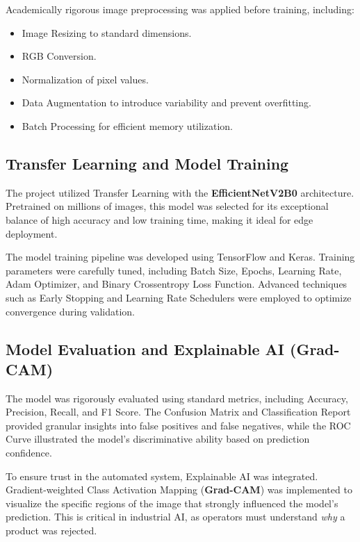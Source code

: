 Academically rigorous image preprocessing was applied before training, including:
\begin{itemize}[leftmargin=1.5cm]
    \item Image Resizing to standard dimensions.
    \item RGB Conversion.
    \item Normalization of pixel values.
    \item Data Augmentation to introduce variability and prevent overfitting.
    \item Batch Processing for efficient memory utilization.
\end{itemize}

\subsection{Transfer Learning and Model Training}

The project utilized Transfer Learning with the \textbf{EfficientNetV2B0} architecture. Pretrained on millions of images, this model was selected for its exceptional balance of high accuracy and low training time, making it ideal for edge deployment.

The model training pipeline was developed using TensorFlow and \cite{keras} Keras. Training parameters were carefully tuned, including Batch Size, Epochs, Learning Rate, Adam Optimizer, and Binary Crossentropy Loss Function. Advanced techniques such as Early Stopping and Learning Rate Schedulers were employed to optimize convergence during validation.

\subsection{Model Evaluation and Explainable AI (Grad-CAM)}

The model was rigorously evaluated using standard metrics, including Accuracy, Precision, Recall, and F1 Score. The Confusion Matrix and Classification Report provided granular insights into false positives and false negatives, while the ROC Curve illustrated the model's discriminative ability based on prediction confidence.

To ensure trust in the automated system, Explainable AI was integrated. Gradient-weighted Class Activation Mapping (\textbf{Grad-CAM}) was implemented to visualize the specific regions of the image that strongly influenced the model's prediction. This is critical in industrial AI, as operators must understand \textit{why} a product was rejected.

